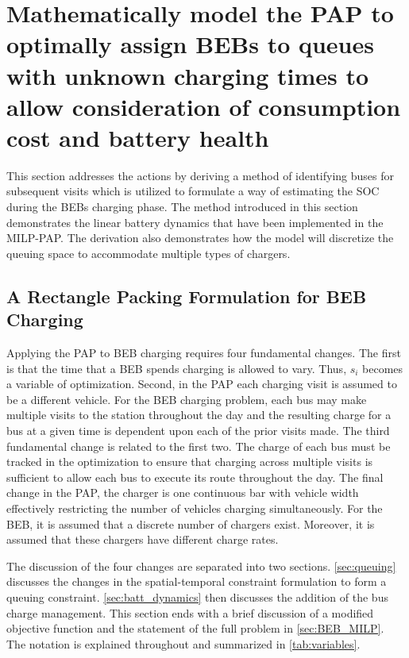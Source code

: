 \documentclass[ee,msthesis]{usuthesis}
\begin{document}
\section{Mathematically model the PAP to optimally assign BEBs to queues with unknown charging times to allow consideration of consumption cost and battery health}
\label{sec:act-math-model-pap}
This section addresses the actions by deriving a method of identifying buses for subsequent visits which is utilized to
formulate a way of estimating the SOC during the BEBs charging phase. The method introduced in this section demonstrates
the linear battery dynamics that have been implemented in the MILP-PAP. The derivation also demonstrates how the model
will discretize the queuing space to accommodate multiple types of chargers.

\subsection{A Rectangle Packing Formulation for BEB Charging}
\label{sec:problemformulation}
Applying the PAP to BEB charging requires four fundamental changes. The first is that the time that a BEB spends
charging is allowed to vary. Thus, \(s_i\) becomes a variable of optimization. Second, in the PAP each charging visit is
assumed to be a different vehicle. For the BEB charging problem, each bus may make multiple visits to the station
throughout the day and the resulting charge for a bus at a given time is dependent upon each of the prior visits made.
The third fundamental change is related to the first two. The charge of each bus must be tracked in
the optimization to ensure that charging across multiple visits is sufficient to allow each bus to execute its route throughout the day.
The final change in the PAP, the charger is one continuous bar with vehicle width effectively restricting the number of vehicles
charging simultaneously. For the BEB, it is assumed that a discrete number of chargers exist. Moreover, it is assumed
that these chargers have different charge rates.

The discussion of the four changes are separated into two sections. \autoref{sec:queuing} discusses the changes in the
spatial-temporal constraint formulation to form a queuing constraint. \autoref{sec:batt_dynamics} then discusses the
addition of the bus charge management. This section ends with a brief discussion of a modified objective function and
the statement of the full problem in \autoref{sec:BEB_MILP}. The notation is explained throughout and summarized in
\autoref{tab:variables}.
\end{document}

